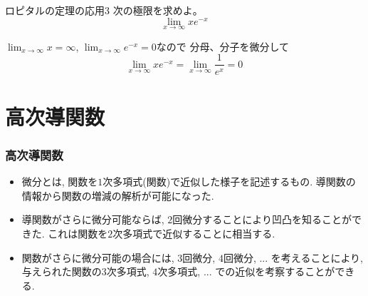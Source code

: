 \begin{slide}{ロピタルの定理の応用3}
次の極限を求めよ。
\begin{equation}
\lim_{x \to \infty} xe^{-x} \nonumber
\end{equation}
\vspace{5mm}


$\lim_{x\to \infty} x  = \infty$,  $\lim_{x\to \infty} e^{-x} = 0$なので
分母、分子を微分して
\begin{equation}
\lim_{x \to \infty} xe^{-x} = \lim_{x \to \infty}\frac{ 1}{e^{x}} = 0  \nonumber
\end{equation}


\end{slide}







\section{高次導関数}


\begin{frame}
\frametitle{高次導関数}


\begin{itemize}
\item 微分とは, 関数を$1$次多項式(関数)で近似した様子を記述するもの. 
導関数の情報から関数の増減の解析が可能になった. 
\item 導関数がさらに微分可能ならば, $2$回微分することにより凹凸を知ることができた. 
これは関数を$2$次多項式で近似することに相当する.
\item 関数がさらに微分可能の場合には, $3$回微分, $4$回微分, ... を考えることにより, 
与えられた関数の$3$次多項式, $4$次多項式, ... での近似を考察することができる. 
\end{itemize}


\end{frame}








